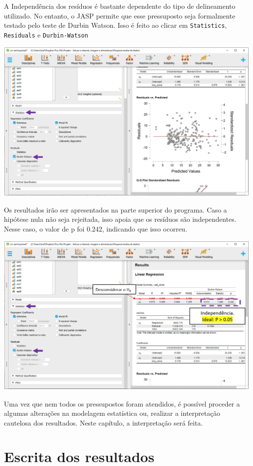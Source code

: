 \documentclass[
]{book}
\begin{document}
A Independência dos resíduos é bastante dependente do tipo de delineamento utilizado. No entanto, o JASP permite que esse pressuposto seja formalmente testado pelo teste de Durbin Watson. Isso é feito ao clicar em \texttt{Statistics}, \texttt{Residuals} e \texttt{Durbin-Watson}

\includegraphics{./img/cap_reg_independencia_jasp.png}

Os resultados irão ser apresentados na parte superior do programa. Caso a hipótese nula não seja rejeitada, isso apoia que os resíduos são independentes. Nesse caso, o valor de p foi 0.242, indicando que isso ocorreu.

\includegraphics{./img/cap_reg_independencia2_jasp.png}

Uma vez que nem todos os pressupostos foram atendidos, é possível proceder a algumas alterações na modelagem estatística ou, realizar a interpretação cautelosa dos resultados. Neste capítulo, a interpretação será feita.

\hypertarget{escrita-dos-resultados-4}{%
\section{Escrita dos resultados}\label{escrita-dos-resultados-4}}
\end{document}
